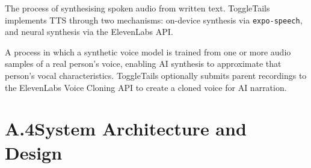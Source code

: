 \begin{description}[leftmargin=2.5cm, style=nextline]
\item[\textbf{Text-to-Speech (TTS)}]
The process of synthesising spoken audio from written text. ToggleTails
implements TTS through two mechanisms: on-device synthesis via
\texttt{expo-speech}, and neural synthesis via the ElevenLabs API.

\item[\textbf{Voice Cloning}]
A process in which a synthetic voice model is trained from one or more audio
samples of a real person's voice, enabling AI synthesis to approximate that
person's vocal characteristics. ToggleTails optionally submits parent
recordings to the ElevenLabs Voice Cloning API to create a cloned voice for
AI narration.

\end{description}

\section*{A.4\quad System Architecture and Design}

